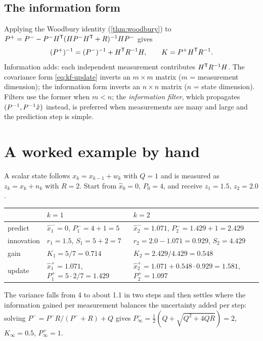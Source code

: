 \subsection{The information form}

Applying the Woodbury identity (\cref{thm:woodbury}) to $P^+ = P^- - P^-H^{\mathsf{T}}(HP^-H^{\mathsf{T}} + R)^{-1} HP^-$ gives
\begin{equation}
  (P^+)^{-1} = (P^-)^{-1} + H^{\mathsf{T}} R^{-1} H, \qquad K = P^+ H^{\mathsf{T}} R^{-1} .
  \label{eq:kf-info}
\end{equation}
Information adds: each independent measurement contributes $H^{\mathsf{T}} R^{-1} H$. The covariance form \eqref{eq:kf-update} inverts an $m\times m$ matrix ($m$ =
measurement dimension); the information form inverts an $n\times n$ matrix ($n$ = state dimension). Filters use the former when $m < n$; the
\emph{information filter}, which propagates $(P^{-1}, P^{-1}\hat x)$ instead, is preferred when measurements are many and large and the prediction step is
simple.

\section{A worked example by hand}

\begin{worked}
A scalar state follows $x_k = x_{k-1} + w_k$ with $Q = 1$ and is measured as $z_k = x_k + n_k$ with $R = 2$. Start from $\hat x_0 = 0$, $P_0 = 4$, and receive
$z_1 = 1.5$, $z_2 = 2.0$.
\begin{center}\small
\begin{tabular}{@{}l l l@{}}
\toprule
 & $k = 1$ & $k = 2$ \\
\midrule
predict & $\hat x_1^- = 0$, $P_1^- = 4 + 1 = 5$ & $\hat x_2^- = 1.071$, $P_2^- = 1.429 + 1 = 2.429$ \\
innovation & $r_1 = 1.5$, $S_1 = 5 + 2 = 7$ & $r_2 = 2.0 - 1.071 = 0.929$, $S_2 = 4.429$ \\
gain & $K_1 = 5/7 = 0.714$ & $K_2 = 2.429/4.429 = 0.548$ \\
update & $\hat x_1^+ = 1.071$, $P_1^+ = 5\cdot2/7 = 1.429$ & $\hat x_2^+ = 1.071 + 0.548\cdot0.929 = 1.581$, $P_2^+ = 1.097$ \\
\bottomrule
\end{tabular}
\end{center}
The variance falls from 4 to about 1.1 in two steps and then settles where the information gained per measurement balances the uncertainty added per
step: solving $P^- = P^-R/(P^- + R) + Q$ gives $P^-_\infty = \tfrac12(Q + \sqrt{Q^2 + 4QR}) = 2$, $K_\infty = 0.5$, $P^+_\infty = 1$.
\end{worked}

